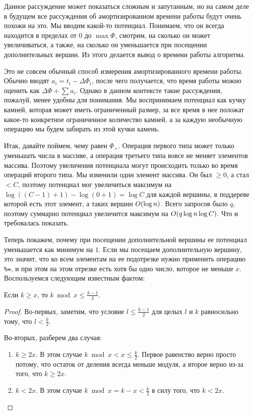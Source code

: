 Данное рассуждение может показаться сложным и запутанным, но на самом деле в будущем все рассуждения об амортизированном времени работы будут очень похожи на это. Мы вводим какой-то потенциал. Понимаем, что он всегда находится в пределах от $0$ до $\max\Phi$, смотрим, на сколько он может увеличиваться, а также, на сколько он уменьшается при посещении дополнительных вершин. Из этого делается вывод о времени работы алгоритма.

\begin{observation}
    Это не совсем обычный способ измерения амортизированного времени работы. Обычно вводят $a_i = t_i - \Delta \Phi_i$, после чего получается, что время работы можно оценить как $\Delta \Phi + \sum a_i$. Однако в данном контексте такие рассуждения, пожалуй, менее удобны для понимания. Мы воспринимаем потенциал как кучку камней, которая может иметь ограниченный размер, за все время в нее положат какое-то конкретное ограниченное количество камней, а за каждую необычную операцию мы будем забирать из этой кучки камень.
\end{observation}

Итак, давайте поймем, чему равен $\Phi_+$. Операция первого типа может только уменьшать числа в массиве, а операция третьего типа вовсе не меняет элементов массива. Поэтому увеличения потенциала могут происходить только во время операций второго типа. Мы изменили один элемент массива. Он был $\ge 0$, а стал $< C$, поэтому потенциал мог увеличиться максимум на $\log ((C - 1) + 1) - \log(0 + 1) = \log C$ для каждой вершины, в поддереве которой есть этот элемент, а таких вершин $O(\log n)$. Всего запросов было $q$, поэтому суммарно потенциал увеличится максимум на $O(q \log n \log C)$. Что и требовалась показать.

Теперь покажем, почему при посещении дополнительной вершины ее потенциал уменьшается как минимум на $1$. Если мы посещаем дополнительную вершину, это значит, что ко всем элементам на ее подотрезке нужно применить операцию \verb+%=+, и при этом на этом отрезке есть хотя бы одно число, которое не меньше $x$. Воспользуемся следующим известным фактом:

\begin{theorem}
    Если $k \ge x$, то $k \bmod x \le \frac{k - 1}{2}$.
\end{theorem}

\begin{proof}
    Во-первых, заметим, что условие $l \le \frac{k - 1}{2}$ для целых $l$ и $k$ равносильно тому, что $l < \frac{k}{2}$.

    Во-вторых, разберем два случая:

    \begin{enumerate}
        \item $k \ge 2 x$. В этом случае $k \bmod x < x \le \frac{k}{2}$. Первое равенство верно просто потому, что остаток от деления всегда меньше модуля, а второе верно из-за того, что $k \ge 2 x$.

        \item $k < 2x$. В этом случае $k \bmod x = k - x < \frac{k}{2}$ в силу того, что $k < 2x$.
    \end{enumerate}
\end{proof}

